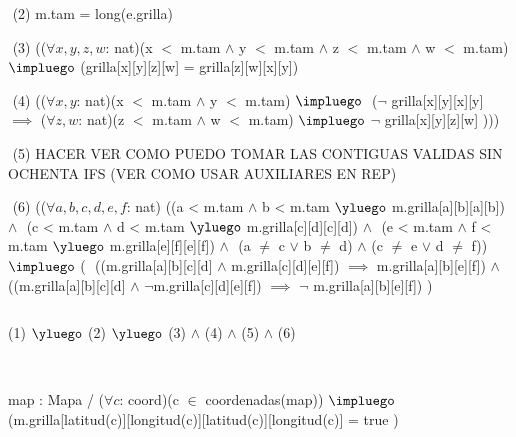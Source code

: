 \begin{Representacion}
$ $\newline
(2)
m.tam = long(e.grilla)

$ $\newline
(3) 
(($\forall x, y, z, w$: nat)(x $<$ m.tam $\land$ y $<$ m.tam $\land$ z $<$ m.tam $\land$ w $<$ m.tam) $\impluego$ (grilla[x][y][z][w] = grilla[z][w][x][y])

$ $\newline
(4)
(($\forall x, y$: nat)(x $<$ m.tam $\land$ y $<$ m.tam) $\impluego$ $ $\newline 
($\neg$ grilla[x][y][x][y] $\implies$
($\forall z, w$: nat)(z $<$ m.tam $\land$ w $<$ m.tam) $\impluego$
$\neg$ grilla[x][y][z][w] ))) 

$ $\newline
(5)
HACER
VER COMO PUEDO TOMAR LAS CONTIGUAS VALIDAS SIN OCHENTA IFS
(VER COMO USAR AUXILIARES EN REP)

$ $\newline
(6)
(($\forall a, b, c, d, e, f$: nat)$ $\newline
((a < m.tam $\land$ b < m.tam $\yluego$ m.grilla[a][b][a][b]) $\land$ $ $\newline
(c < m.tam $\land$ d < m.tam $\yluego$ m.grilla[c][d][c][d]) $\land$ $ $\newline
(e < m.tam $\land$ f < m.tam $\yluego$ m.grilla[e][f][e][f]) $\land$ $ $\newline
(a $\neq$ c $\lor$ b $\neq$ d) $\land$ (c $\neq$ e $\lor$ d $\neq$ f)) $ $\newline
$\impluego$ ( $ $\newline
((m.grilla[a][b][c][d] $\land$ m.grilla[c][d][e][f]) $\implies$ m.grilla[a][b][e][f]) $\land $\newline
((m.grilla[a][b][c][d] $\land$ $\neg$m.grilla[c][d][e][f]) $\implies$ $\neg$ m.grilla[a][b][e][f])$ $\newline
)

$ $\newline

%
{{(1) $\yluego$ (2) $\yluego$ (3) $\land$ (4) $\land$ (5) $\land$ (6)}} 

$ $\newline
$ $\newline



%
{map : Mapa / ($\forall c$: coord)(c $\in$ coordenadas(map)) $\impluego$ \\
(m.grilla[latitud(c)][longitud(c)][latitud(c)][longitud(c)] = true )}%

\end{Representacion}

